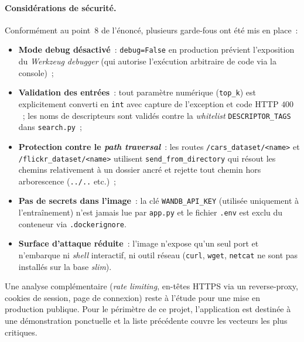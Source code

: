 \documentclass[a4paper,11pt]{article}
\begin{document}
\paragraph{Considérations de sécurité.}
Conformément au point~8 de l'énoncé, plusieurs garde-fous ont été mis en
place~:
\begin{itemize}
    \item \textbf{Mode debug désactivé}~: \texttt{debug=False} en
    production prévient l'exposition du \textit{Werkzeug debugger} (qui
    autorise l'exécution arbitraire de code via la console)~;

    \item \textbf{Validation des entrées}~: tout paramètre numérique
    (\texttt{top\_k}) est explicitement converti en \texttt{int} avec
    capture de l'exception et code HTTP $400$~; les noms de descripteurs
    sont validés contre la \textit{whitelist}
    \texttt{DESCRIPTOR\_TAGS} dans \texttt{search.py}~;

    \item \textbf{Protection contre le \textit{path traversal}}~: les
    routes \texttt{/cars\_dataset/<name>} et \newline
    \texttt{/flickr\_dataset/<name>} utilisent \texttt{send\_from\_directory}
    qui résout les chemins relativement à un dossier ancré et rejette
    tout chemin hors arborescence (\texttt{../..} etc.)~;

    \item \textbf{Pas de secrets dans l'image}~: la clé
    \texttt{WANDB\_API\_KEY} (utilisée uniquement à l'entraînement)
    n'est jamais lue par \texttt{app.py} et le fichier
    \texttt{.env} est exclu du conteneur via \texttt{.dockerignore}.

    \item \textbf{Surface d'attaque réduite}~: l'image n'expose qu'un
    seul port et n'embarque ni \textit{shell} interactif, ni outil
    réseau (\texttt{curl}, \texttt{wget}, \texttt{netcat} ne sont pas
    installés sur la base \textit{slim}).
\end{itemize}
Une analyse complémentaire (\textit{rate limiting}, en-têtes HTTPS via
un reverse-proxy, cookies de session, page de connexion) reste à
l'étude pour une mise en production publique. Pour le périmètre de ce
projet, l'application est destinée à une démonstration ponctuelle et la
liste précédente couvre les vecteurs les plus critiques.
\end{document}
